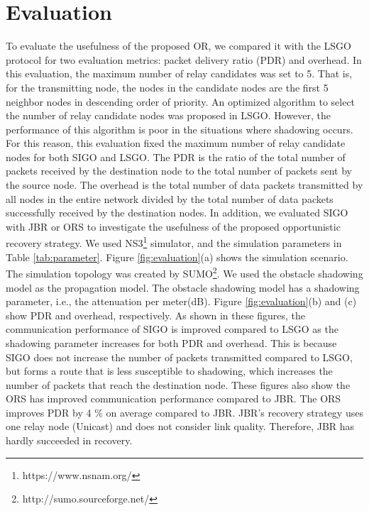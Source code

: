\documentclass{comex}
\begin{document}
\section{Evaluation}

To evaluate the usefulness of the proposed OR, we compared it with the LSGO protocol for two evaluation metrics: packet delivery ratio (PDR) and overhead. 
In this evaluation, the maximum number of relay candidates was set to 5. 
That is, for the transmitting node,  the nodes in the candidate nodes are the first 5 neighbor nodes in descending order of priority. 
An optimized algorithm to select the number of relay candidate nodes was proposed in LSGO.
However, the performance of this algorithm is poor in the situations where shadowing occurs. 
For this reason, this evaluation fixed the maximum number of relay candidate nodes for both SIGO and LSGO.
The PDR is the ratio of the total number of packets received by the destination node to the total number of packets sent by the source node. The overhead is the total number of data packets transmitted by all nodes in the entire network divided by the total number of data packets successfully received by the destination nodes. 
In addition, we evaluated SIGO with JBR or ORS to investigate the usefulness of the proposed opportunistic recovery strategy. We used NS3\footnote{https://www.nsnam.org/} simulator, and the simulation parameters in Table \ref{tab:parameter}. Figure \ref{fig:evaluation}(a) shows the simulation scenario. The simulation topology was created by SUMO\footnote{http://sumo.sourceforge.net/}. We used the obstacle shadowing model as the propagation model. The obstacle shadowing model has a shadowing parameter, i.e., the attenuation per meter(dB). 
Figure \ref{fig:evaluation}(b) and (c) show PDR and overhead, respectively.  As shown in these figures, the communication performance of SIGO is improved compared to LSGO as the shadowing parameter increases for both PDR and overhead. This is because SIGO does not increase the number of packets transmitted compared to LSGO, but forms a route that is less susceptible to shadowing, which increases the number of packets that reach the destination node. These figures also show the ORS has improved communication performance compared to JBR. The ORS improves PDR by 4 \% on average compared to JBR. JBR’s recovery strategy uses one relay node (Unicast) and does not consider link quality. Therefore, JBR has hardly succeeded in recovery. 
\end{document}
